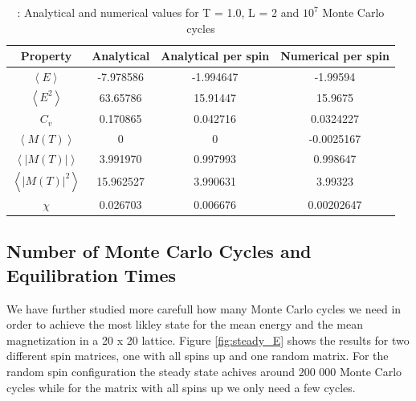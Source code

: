 \documentclass{article}
\begin{document}
{\renewcommand{\arraystretch}{1.5}
\begin{table}[h!]
  \caption{: Analytical and numerical values for T = 1.0, L = 2 and $10^7$ Monte Carlo cycles }
    \label{Tab: values}
    \centering
  \begin{tabular}{c c c c}
    Property & Analytical & Analytical per spin & Numerical per spin \\
    \hline
    $\left<E\right>$ & -7.978586  & -1.994647 & -1.99594\\
    $\left<E^2\right>$ & 63.65786 & 15.91447 &15.9675 \\
    $C_v$ & 0.170865 & 0.042716 & 0.0324227 \\
    $\left<M(T)\right>$  & 0 & 0 & -0.0025167\\
    $\left<|M(T)|\right>$ & 3.991970 & 0.997993 & 0.998647 \\
    $\left<|M(T)|^2\right> $ & 15.962527 & 3.990631 & 3.99323\\
    $\chi$ & 0.026703 & 0.006676 & 0.00202647\\
  \end{tabular}
\end{table}

\subsection{Number of Monte Carlo Cycles and Equilibration Times}

We have further studied more carefull how many Monte Carlo cycles we need in order to achieve the most likley state for the mean energy and the mean magnetization in a 20 x 20 lattice. Figure \ref{fig:steady_E} shows the results for two different spin matrices, one with all spins up and one random matrix. For the random spin configuration the steady state achives around 200 000 Monte Carlo cycles while for the matrix with all spins up we only need a few cycles.

}
\end{document}
